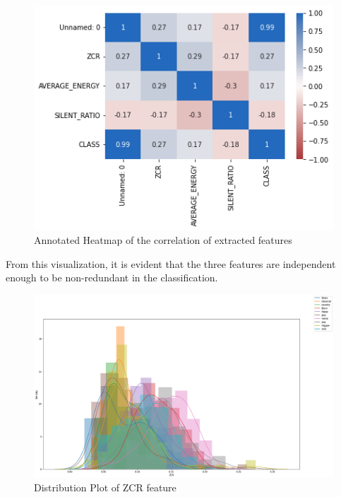 \documentclass[12pt]{article}
\begin{document}
	\begin{figure}[H]
		\hspace{100pt}\includegraphics[scale=0.7]{visual_8_1}
		\caption{Annotated Heatmap of the correlation of extracted features}
	\end{figure}
	From this visualization, it is evident that the three features are independent enough to be non-redundant in the classification. 
	
	\begin{figure}[H]
		\hspace{40pt}\includegraphics[scale=0.55]{visual_4_1}
		\caption{Distribution Plot of ZCR feature}
	\end{figure}
	
\end{document}
